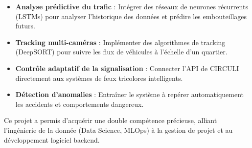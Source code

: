 \documentclass[12pt, a4paper]{report}
\begin{document}
\begin{itemize}
    \item \textbf{Analyse prédictive du trafic} : Intégrer des réseaux de neurones récurrents (LSTMs) pour analyser l'historique des données et prédire les embouteillages futurs.
    \item \textbf{Tracking multi-caméras} : Implémenter des algorithmes de tracking (DeepSORT) pour suivre les flux de véhicules à l'échelle d'un quartier.
    \item \textbf{Contrôle adaptatif de la signalisation} : Connecter l'API de CIRCULI directement aux systèmes de feux tricolores intelligents.
    \item \textbf{Détection d'anomalies} : Entraîner le système à repérer automatiquement les accidents et comportements dangereux.
\end{itemize}

Ce projet a permis d'acquérir une double compétence précieuse, alliant l'ingénierie de la donnée (Data Science, MLOps) à la gestion de projet et au développement logiciel backend.
\end{document}
